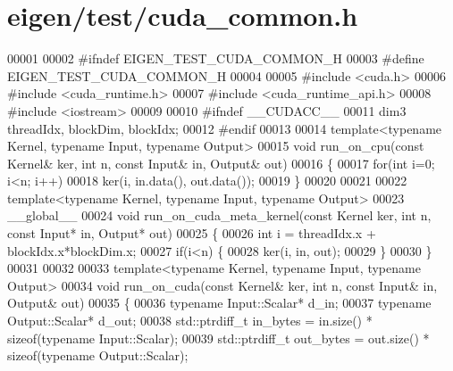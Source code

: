 \hypertarget{eigen_2test_2cuda__common_8h_source}{}\section{eigen/test/cuda\+\_\+common.h}
\label{eigen_2test_2cuda__common_8h_source}

\begin{DoxyCode}
00001 
00002 \textcolor{preprocessor}{#ifndef EIGEN\_TEST\_CUDA\_COMMON\_H}
00003 \textcolor{preprocessor}{#define EIGEN\_TEST\_CUDA\_COMMON\_H}
00004 
00005 \textcolor{preprocessor}{#include <cuda.h>}
00006 \textcolor{preprocessor}{#include <cuda\_runtime.h>}
00007 \textcolor{preprocessor}{#include <cuda\_runtime\_api.h>}
00008 \textcolor{preprocessor}{#include <iostream>}
00009 
00010 \textcolor{preprocessor}{#ifndef \_\_CUDACC\_\_}
00011 dim3 threadIdx, blockDim, blockIdx;
00012 \textcolor{preprocessor}{#endif}
00013 
00014 \textcolor{keyword}{template}<\textcolor{keyword}{typename} Kernel, \textcolor{keyword}{typename} Input, \textcolor{keyword}{typename} Output>
00015 \textcolor{keywordtype}{void} run\_on\_cpu(\textcolor{keyword}{const} Kernel& ker, \textcolor{keywordtype}{int} n, \textcolor{keyword}{const} Input& in, Output& out)
00016 \{
00017   \textcolor{keywordflow}{for}(\textcolor{keywordtype}{int} i=0; i<n; i++)
00018     ker(i, in.data(), out.data());
00019 \}
00020 
00021 
00022 \textcolor{keyword}{template}<\textcolor{keyword}{typename} Kernel, \textcolor{keyword}{typename} Input, \textcolor{keyword}{typename} Output>
00023 \_\_global\_\_
00024 \textcolor{keywordtype}{void} run\_on\_cuda\_meta\_kernel(\textcolor{keyword}{const} Kernel ker, \textcolor{keywordtype}{int} n, \textcolor{keyword}{const} Input* in, Output* out)
00025 \{
00026   \textcolor{keywordtype}{int} i = threadIdx.x + blockIdx.x*blockDim.x;
00027   \textcolor{keywordflow}{if}(i<n) \{
00028     ker(i, in, out);
00029   \}
00030 \}
00031 
00032 
00033 \textcolor{keyword}{template}<\textcolor{keyword}{typename} Kernel, \textcolor{keyword}{typename} Input, \textcolor{keyword}{typename} Output>
00034 \textcolor{keywordtype}{void} run\_on\_cuda(\textcolor{keyword}{const} Kernel& ker, \textcolor{keywordtype}{int} n, \textcolor{keyword}{const} Input& in, Output& out)
00035 \{
00036   \textcolor{keyword}{typename} Input::Scalar*  d\_in;
00037   \textcolor{keyword}{typename} Output::Scalar* d\_out;
00038   std::ptrdiff\_t in\_bytes  = in.size()  * \textcolor{keyword}{sizeof}(\textcolor{keyword}{typename} Input::Scalar);
00039   std::ptrdiff\_t out\_bytes = out.size() * \textcolor{keyword}{sizeof}(\textcolor{keyword}{typename} Output::Scalar);

\end{DoxyCode}
